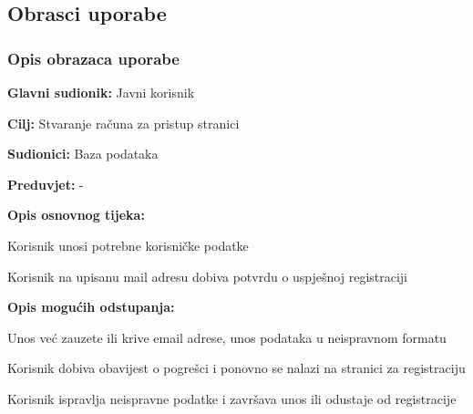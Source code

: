 			\eject 
			
			
				
			\subsection{Obrasci uporabe}
				
				
				\subsubsection{Opis obrazaca uporabe}			

					\noindent {}
					\begin{packed_item}
	
						\item \textbf{Glavni sudionik: }Javni korisnik
						\item  \textbf{Cilj:} Stvaranje računa za pristup stranici
						\item  \textbf{Sudionici:} Baza podataka
						\item  \textbf{Preduvjet:} -
						\item  \textbf{Opis osnovnog tijeka:}
						
						\item[] \begin{packed_enum}
							\item Korisnik unosi potrebne korisničke podatke
							\item Korisnik na upisanu mail adresu dobiva potvrdu o uspješnoj registraciji
						\end{packed_enum}
						
						\item  \textbf{Opis mogućih odstupanja:}

						\item[] \begin{packed_item}
							\item[2.a] Unos već zauzete ili krive email adrese, unos podataka u neispravnom formatu
							\item[] \begin{packed_enum}
								
								\item Korisnik dobiva obavijest o pogrešci i ponovno se nalazi na stranici za registraciju
								\item Korisnik ispravlja neispravne podatke i završava unos ili odustaje od registracije
								
							\end{packed_enum}					
						\end{packed_item}
					\end{packed_item}

